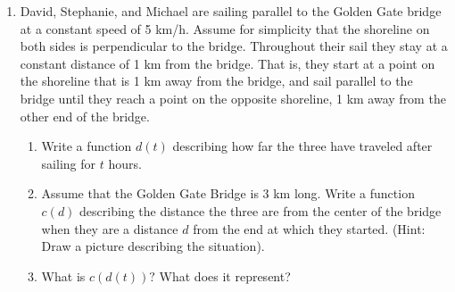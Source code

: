 \documentclass[a4paper,10pt]{article}
\begin{document}
\begin{enumerate}





\item David, Stephanie, and Michael are sailing parallel to the Golden Gate bridge at a constant speed of 5 km/h. Assume for simplicity that the shoreline on both sides is perpendicular to the bridge. Throughout their sail they stay at a constant distance of 1 km from the bridge. That is, they start at a point on the shoreline that is 1 km away from the bridge, and sail parallel to the bridge until they reach a point on the opposite shoreline, 1 km away from the other end of the bridge. 
\begin{enumerate}
\item Write a function $d(t)$ describing how far the three have traveled after sailing for $t$ hours. 
\vspace{2in}
\item Assume that the Golden Gate Bridge is 3 km long. Write a function $c(d)$ describing the distance the three are from the center of the bridge when they are a distance $d$ from the end at which they started. (Hint: Draw a picture describing the situation). 
\vspace{3.5in}

\item What is $c(d(t))?$ What does it represent? 
\vspace{2in}
\end{enumerate}

\end{enumerate}
\end{document}
